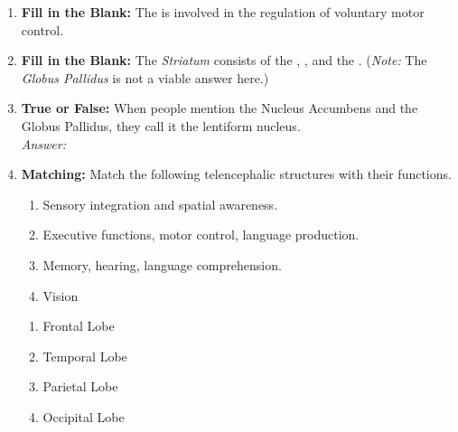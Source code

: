 \begin{enumerate}[label=\textbf{Q1.10.\arabic*}]
      \item \textbf{Fill in the Blank:} The \underline{\hspace{3cm}} is involved in the regulation of voluntary motor control. \\

      \item \textbf{Fill in the Blank:} The \textit{Striatum} consists of the \underline{\hspace{3cm}}, \underline{\hspace{3cm}}, and the \underline{\hspace{3cm}}. (\textit{Note:} The \textit{Globus Pallidus} is not a viable answer here.) \\

      \item \textbf{True or False:} When people mention the Nucleus Accumbens and the Globus Pallidus, they call it the lentiform nucleus. \\
            \textit{Answer:} %

      \item \textbf{Matching:} Match the following telencephalic structures with their functions.
      \begin{wordbox}
            \begin{enumerate}[label=(\roman*)]
                  \item Sensory integration and spatial awareness.
                  \item Executive functions, motor control, language production.
                  \item Memory, hearing, language comprehension.
                  \item Vision
            \end{enumerate}
      \end{wordbox}
      \begin{enumerate}[label=(\alph*)]
            \item Frontal Lobe \quad \dotfill \quad \underline{\hspace{3cm}}\\[0.5em]
            \item Temporal Lobe \quad \dotfill \quad \underline{\hspace{3cm}}\\[0.5em]
            \item Parietal Lobe \quad \dotfill \quad \underline{\hspace{3cm}}\\[0.5em]
            \item Occipital Lobe \quad \dotfill \quad \underline{\hspace{3cm}}
      \end{enumerate}


\end{enumerate}
